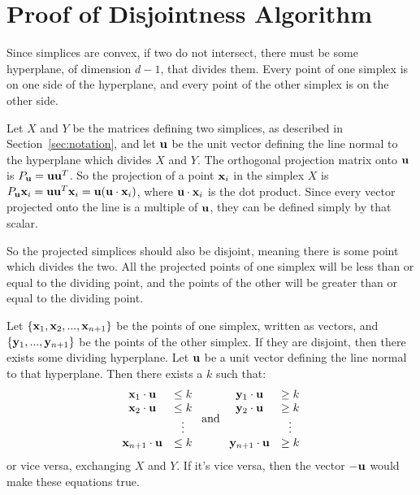 \documentclass[12pt]{scrippsthesis}
\theoremstyle{definition}
\theoremstyle{remark}
\theoremstyle{plain}
\begin{document}
\section{Proof of Disjointness Algorithm}

Since simplices are convex, if two do not intersect, there must be some hyperplane, of dimension $d-1$, that divides them.  Every point of one simplex is on one side of the hyperplane, and every point of the other simplex is on the other side.

Let $X$ and $Y$ be the matrices defining two simplices, as described in Section~\ref{sec:notation}, and let ${\bf u}$ be the unit vector defining the line normal to the hyperplane which divides $X$ and $Y$. The orthogonal projection matrix onto ${\bf u}$ is $P_{\bf u}={\bf u}{\bf u}^T$.  So the projection of a point ${\bf x}_i$ in the simplex $X$ is $P_{\bf u}{\bf x}_i={\bf u}{\bf u}^T{\bf x}_i={\bf u}({\bf u}\cdot{\bf x}_i)$, where ${\bf u}\cdot{\bf x}_i$ is the dot product.  Since every vector projected onto the line is a multiple of ${\bf u}$, they can be defined simply by that scalar.

So the projected simplices should also be disjoint, meaning there is some point which divides the two.  All the projected points of one simplex will be less than or equal to the dividing point, and the points of the other will be greater than or equal to the dividing point.

Let $\{{\bf x}_1,{\bf x}_2,...,{\bf x}_{n+1}\}$ be the points of one simplex, written as vectors, and $\{{\bf y}_1,...,{\bf y}_{n+1}\}$ be the points of the other simplex.  If they are disjoint, then there exists some dividing hyperplane.  Let ${\bf u}$ be a unit vector defining the line normal to that hyperplane.  Then there exists a $k$ such that:
\begin{equation}\begin{array}{cc}
{\bf x}_1 \cdot {\bf u} &\leq k \\
{\bf x}_2 \cdot {\bf u} &\leq k \\
&\vdots \\
{\bf x}_{n+1} \cdot {\bf u} &\leq k
\end{array}
\text{ and }
\begin{array}{cc}
{\bf y}_1 \cdot {\bf u} &\geq k \\
{\bf y}_2 \cdot {\bf u} &\geq k \\
&\vdots \\
{\bf y}_{n+1} \cdot {\bf u} &\geq k
\end{array}\end{equation}
or vice versa, exchanging $X$ and $Y$.  If it's vice versa, then the vector $-{\bf u}$ would make these equations true.
\end{document}
